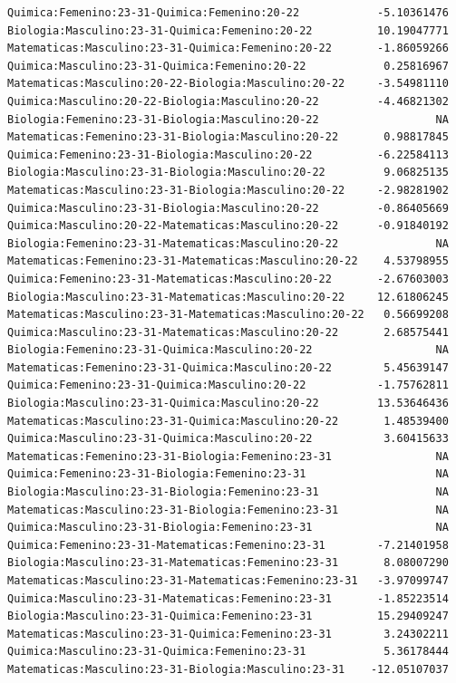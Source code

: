 \documentclass{rapport}
\begin{document}
\begin{itemize}
\begin{verbatim}
Quimica:Femenino:23-31-Quimica:Femenino:20-22            -5.10361476
Biologia:Masculino:23-31-Quimica:Femenino:20-22          10.19047771
Matematicas:Masculino:23-31-Quimica:Femenino:20-22       -1.86059266
Quimica:Masculino:23-31-Quimica:Femenino:20-22            0.25816967
Matematicas:Masculino:20-22-Biologia:Masculino:20-22     -3.54981110
Quimica:Masculino:20-22-Biologia:Masculino:20-22         -4.46821302
Biologia:Femenino:23-31-Biologia:Masculino:20-22                  NA
Matematicas:Femenino:23-31-Biologia:Masculino:20-22       0.98817845
Quimica:Femenino:23-31-Biologia:Masculino:20-22          -6.22584113
Biologia:Masculino:23-31-Biologia:Masculino:20-22         9.06825135
Matematicas:Masculino:23-31-Biologia:Masculino:20-22     -2.98281902
Quimica:Masculino:23-31-Biologia:Masculino:20-22         -0.86405669
Quimica:Masculino:20-22-Matematicas:Masculino:20-22      -0.91840192
Biologia:Femenino:23-31-Matematicas:Masculino:20-22               NA
Matematicas:Femenino:23-31-Matematicas:Masculino:20-22    4.53798955
Quimica:Femenino:23-31-Matematicas:Masculino:20-22       -2.67603003
Biologia:Masculino:23-31-Matematicas:Masculino:20-22     12.61806245
Matematicas:Masculino:23-31-Matematicas:Masculino:20-22   0.56699208
Quimica:Masculino:23-31-Matematicas:Masculino:20-22       2.68575441
Biologia:Femenino:23-31-Quimica:Masculino:20-22                   NA
Matematicas:Femenino:23-31-Quimica:Masculino:20-22        5.45639147
Quimica:Femenino:23-31-Quimica:Masculino:20-22           -1.75762811
Biologia:Masculino:23-31-Quimica:Masculino:20-22         13.53646436
Matematicas:Masculino:23-31-Quimica:Masculino:20-22       1.48539400
Quimica:Masculino:23-31-Quimica:Masculino:20-22           3.60415633
Matematicas:Femenino:23-31-Biologia:Femenino:23-31                NA
Quimica:Femenino:23-31-Biologia:Femenino:23-31                    NA
Biologia:Masculino:23-31-Biologia:Femenino:23-31                  NA
Matematicas:Masculino:23-31-Biologia:Femenino:23-31               NA
Quimica:Masculino:23-31-Biologia:Femenino:23-31                   NA
Quimica:Femenino:23-31-Matematicas:Femenino:23-31        -7.21401958
Biologia:Masculino:23-31-Matematicas:Femenino:23-31       8.08007290
Matematicas:Masculino:23-31-Matematicas:Femenino:23-31   -3.97099747
Quimica:Masculino:23-31-Matematicas:Femenino:23-31       -1.85223514
Biologia:Masculino:23-31-Quimica:Femenino:23-31          15.29409247
Matematicas:Masculino:23-31-Quimica:Femenino:23-31        3.24302211
Quimica:Masculino:23-31-Quimica:Femenino:23-31            5.36178444
Matematicas:Masculino:23-31-Biologia:Masculino:23-31    -12.05107037

\end{verbatim}
\end{itemize}
\end{document}
